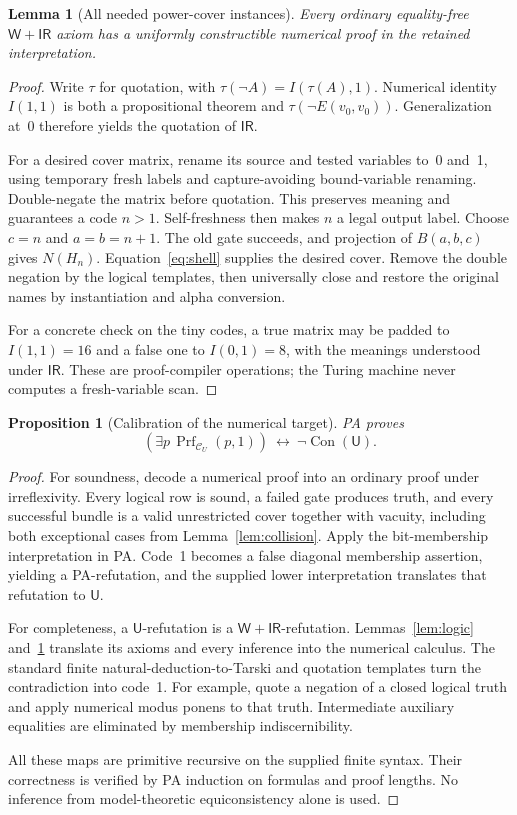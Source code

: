 \documentclass[11pt]{article}
\newcommand{\ThU}{\mathsf U}
\newcommand{\ThW}{\mathsf W}
\newcommand{\IR}{\mathsf{IR}}
\newcommand{\Con}{\operatorname{Con}}
\newcommand{\CU}{\mathcal C_U}
\newtheorem{lemma}[theorem]{Lemma}
\newtheorem{proposition}[theorem]{Proposition}
\theoremstyle{definition}\newtheorem{definition}[theorem]{Definition}
\begin{document}
\begin{lemma}[All needed power-cover instances]\label{lem:cover-complete}
Every ordinary equality-free $\ThW+\IR$ axiom has a uniformly constructible
numerical proof in the retained interpretation.
\end{lemma}
\begin{proof}
Write $\tau$ for quotation, with
$\tau(\neg A)=I(\tau(A),1)$. Numerical identity $I(1,1)$ is both a
propositional theorem and $\tau(\neg E(v_0,v_0))$. Generalization at~0
therefore yields the quotation of $\IR$.

For a desired cover matrix, rename its source and tested variables to~0
and~1, using temporary fresh labels and capture-avoiding bound-variable
renaming. Double-negate the matrix before quotation. This preserves
meaning and guarantees a code $n>1$. Self-freshness then makes $n$ a
legal output label. Choose $c=n$ and $a=b=n+1$. The old gate succeeds,
and projection of $B(a,b,c)$ gives $N(H_n)$. Equation~\eqref{eq:shell}
supplies the desired cover. Remove the double negation by the logical
templates, then universally close and restore the original names by
instantiation and alpha conversion.

For a concrete check on the tiny codes, a true matrix may be padded to
$I(1,1)=16$ and a false one to $I(0,1)=8$, with the meanings understood
under $\IR$. These are proof-compiler
operations; the Turing machine never computes a fresh-variable scan.
\end{proof}

\begin{proposition}[Calibration of the numerical target]\label{prop:calibration}
PA proves
\[
  (\exists p\,\operatorname{Prf}_{\CU}(p,1))
           \ \longleftrightarrow\ \neg\Con(\ThU).
\]
\end{proposition}
\begin{proof}
For soundness, decode a numerical proof into an ordinary proof under
irreflexivity. Every logical row is sound, a failed gate produces truth,
and every successful bundle is a valid unrestricted cover together with
vacuity, including both exceptional cases from
Lemma~\ref{lem:collision}. Apply the bit-membership interpretation in PA.
Code~1 becomes a false diagonal membership assertion, yielding a
PA-refutation, and the supplied lower interpretation translates that
refutation to $\ThU$.

For completeness, a $\ThU$-refutation is a $\ThW+\IR$-refutation.
Lemmas~\ref{lem:logic} and~\ref{lem:cover-complete} translate its axioms
and every inference into the numerical calculus. The standard finite
natural-deduction-to-Tarski and quotation templates turn the contradiction
into code~1. For example, quote a negation of a closed logical truth and
apply numerical modus ponens to that truth. Intermediate auxiliary
equalities are eliminated by membership indiscernibility.

All these maps are primitive recursive on the supplied finite syntax.
Their correctness is verified by PA induction on formulas and proof
lengths. No inference from model-theoretic equiconsistency alone is used.
\end{proof}
\end{document}
